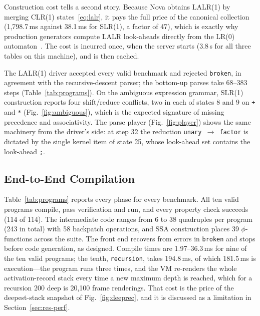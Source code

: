 \documentclass[conference]{IEEEtran}
\newcommand{\code}[1]{\texttt{#1}}
\begin{document}
Construction cost tells a second story. Because Nova obtains LALR(1) by merging CLR(1) states~\eqref{eq:lalr}, it pays the full price of the canonical collection (1,798.7\,ms against 38.1\,ms for SLR(1), a factor of 47), which is exactly why production generators compute LALR look-aheads directly from the LR(0) automaton~\cite{deremer1982}. The cost is incurred once, when the server starts (3.8\,s for all three tables on this machine), and is then cached.

The LALR(1) driver accepted every valid benchmark and rejected \code{broken}, in agreement with the recursive-descent parser; the bottom-up parses take 68--383 steps (Table~\ref{tab:programs}). On the ambiguous expression grammar, SLR(1) construction reports four shift/reduce conflicts, two in each of states 8 and 9 on \code{+} and \code{*} (Fig.~\ref{fig:ambiguous}), which is the expected signature of missing precedence and associativity. The parse player (Fig.~\ref{fig:player}) shows the same machinery from the driver's side: at step 32 the reduction \code{unary $\to$ factor} is dictated by the single kernel item of state 25, whose look-ahead set contains the look-ahead \code{;}.

\subsection{End-to-End Compilation}
Table~\ref{tab:programs} reports every phase for every benchmark. All ten valid programs compile, pass verification and run, and every property check succeeds (114 of 114). The intermediate code ranges from 6 to 38 quadruples per program (243 in total) with 58 backpatch operations, and SSA construction places 39 $\phi$-functions across the suite. The front end recovers from errors in \code{broken} and stops before code generation, as designed. Compile times are 1.97--36.3\,ms for nine of the ten valid programs; the tenth, \code{recursion}, takes 194.8\,ms, of which 181.5\,ms is execution---the program runs three times, and the VM re-renders the whole activation-record stack every time a new maximum depth is reached, which for a recursion 200 deep is 20,100 frame renderings. That cost is the price of the deepest-stack snapshot of Fig.~\ref{fig:deeprec}, and it is discussed as a limitation in Section~\ref{sec:res-perf}.
\end{document}
